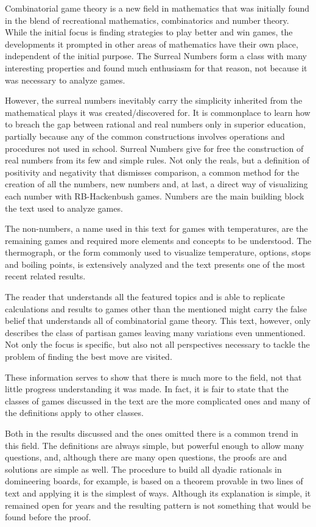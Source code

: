 Combinatorial game theory is a new field in mathematics that was initially found in the blend of recreational mathematics, combinatorics and number theory. While the initial focus is finding strategies to play better and win games, the developments it prompted in other areas of mathematics have their own place, independent of the initial purpose. The Surreal Numbers form a class with many interesting properties and found much enthusiasm for that reason, not because it was necessary to analyze games.

However, the surreal numbers inevitably carry the simplicity inherited from the mathematical plays it was created/discovered for. It is commonplace to learn how to breach the gap between rational and real numbers only in superior education, partially because any of the common constructions involves operations and procedures not used in school. Surreal Numbers give for free the construction of real numbers from its few and simple rules. Not only the reals, but a definition of positivity and negativity that dismisses comparison, a common method for the creation of all the numbers, new numbers and, at last, a direct way of visualizing each number with RB-Hackenbush games. Numbers are the main building block the text used to analyze games.

The non-numbers, a name used in this text for games with temperatures, are the remaining games and required more elements and concepts to be understood. The thermograph, or the form commonly used to visualize temperature, options, stops and boiling points, is extensively analyzed and the text presents one of the most recent related results.

The reader that understands all the featured topics and is able to replicate calculations and results to games other than the mentioned might carry the false belief that understands all of combinatorial game theory. This text, however, only describes the class of partisan games leaving many variations even unmentioned. Not only the focus is specific, but also not all perspectives necessary to tackle the problem of finding the best move are visited.

These information serves to show that there is much more to the field, not that little progress understanding it was made. In fact, it is fair to state that the classes of games discussed in the text are the more complicated ones and many of the definitions apply to other classes.

Both in the results discussed and the ones omitted there is a common trend in this field. The definitions are always simple, but powerful enough to allow many questions, and, although there are many open questions, the proofs are and solutions are simple as well. The procedure to build all dyadic rationals in domineering boards, for example, is based on a theorem provable in two lines of text and applying it is the simplest of ways. Although its explanation is simple, it remained open for years and the resulting pattern is not something that would be found before the proof.

